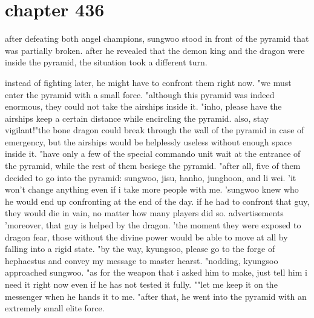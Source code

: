 \section{chapter 436}

after defeating both angel champions, sungwoo stood in front of the pyramid that was partially broken.
 after he revealed that the demon king and the dragon were inside the pyramid, the situation took a different turn.





instead of fighting later, he might have to confront them right now.
"we must enter the pyramid with a small force.
"although this pyramid was indeed enormous, they could not take the airships inside it.
"inho, please have the airships keep a certain distance while encircling the pyramid.
 also, stay vigilant!"the bone dragon could break through the wall of the pyramid in case of emergency, but the airships would be helplessly useless without enough space inside it.
"have only a few of the special commando unit wait at the entrance of the pyramid, while the rest of them besiege the pyramid.
"after all, five of them decided to go into the pyramid: sungwoo, jisu, hanho, junghoon, and li wei.
 'it won't change anything even if i take more people with me.
'sungwoo knew who he would end up confronting at the end of the day.
 if he had to confront that guy, they would die in vain, no matter how many players did so.
advertisements    'moreover, that guy is helped by the dragon.
'the moment they were exposed to dragon fear, those without the divine power would be able to move at all by falling into a rigid state.
"by the way, kyungsoo, please go to the forge of hephaestus and convey my message to master hearst.
"nodding, kyungsoo approached sungwoo.
 "as for the weapon that i asked him to make, just tell him i need it right now even if he has not tested it fully.
""let me keep it on the messenger when he hands it to me.
"after that, he went into the pyramid with an extremely small elite force.
 
